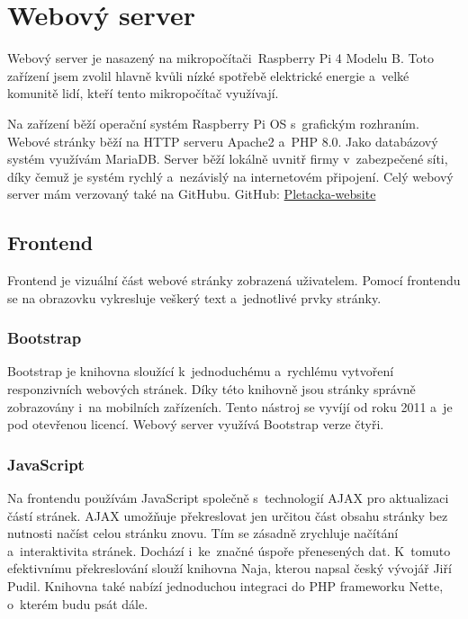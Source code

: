 \chapter{Webový server}
Webový server je nasazený na mikropočítači~Raspberry Pi 4 Modelu B.
Toto zařízení jsem zvolil hlavně kvůli nízké spotřebě elektrické energie a~velké komunitě lidí, kteří tento mikropočítač využívají.

Na zařízení běží operační systém Raspberry Pi OS s~grafickým rozhraním.
Webové stránky běží na HTTP serveru Apache2 a~PHP 8.0.
Jako databázový systém využívám MariaDB.
Server běží lokálně uvnitř firmy v~zabezpečené síti, díky čemuž je systém rychlý a~nezávislý na internetovém připojení.
Celý webový server mám verzovaný také na GitHubu.\newline
GitHub: \href{https://github.com/Pletacka-IoT/Pletacka-website}{Pletacka-website}\cite{PL_WEB}

\section{Frontend}
 
Frontend je vizuální část webové stránky zobrazená uživatelem.
Pomocí \newline frontendu se na obrazovku vykresluje veškerý text a~jednotlivé prvky stránky.

\subsection{Bootstrap}
Bootstrap je knihovna sloužící k~jednoduchému a~rychlému vytvoření responzivních webových stránek.
Díky této knihovně jsou stránky správně zobrazovány i~na mobilních zařízeních.
Tento nástroj se vyvíjí od roku 2011 a~je pod otevřenou licencí.
Webový server využívá Bootstrap verze čtyři.


\subsection{JavaScript}
Na frontendu používám JavaScript společně s~technologií AJAX pro aktualizaci částí stránek. AJAX umožňuje překreslovat jen určitou část obsahu stránky bez nutnosti načíst celou stránku znovu.
Tím se zásadně zrychluje načítání a~interaktivita stránek. Dochází i~ke~značné úspoře přenesených dat.
K~tomuto efektivnímu překreslování slouží knihovna Naja\cite{NAJA}, kterou napsal český vývojář Jiří Pudil.
Knihovna také nabízí jednoduchou integraci do PHP frameworku Nette, o~kterém budu psát dále.   



